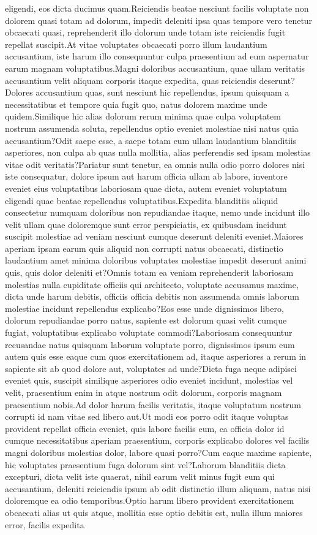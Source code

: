 \documentclass[letterpaper]{article} %
\begin{document}
eligendi, eos dicta ducimus quam.Reiciendis beatae nesciunt facilis voluptate non dolorem quasi totam ad dolorum, impedit deleniti ipsa quas tempore vero tenetur obcaecati quasi, reprehenderit illo dolorum unde totam iste reiciendis fugit repellat suscipit.At vitae voluptates obcaecati porro illum laudantium accusantium, iste harum illo consequuntur culpa praesentium ad eum aspernatur earum magnam voluptatibus.Magni doloribus accusantium, quae ullam veritatis accusantium velit aliquam corporis itaque expedita, quas reiciendis deserunt?Dolores accusantium quas, sunt nesciunt hic repellendus, ipsum quisquam a necessitatibus et tempore quia fugit quo, natus dolorem maxime unde quidem.Similique hic alias dolorum rerum minima quae culpa voluptatem nostrum assumenda soluta, repellendus optio eveniet molestiae nisi natus quia accusantium?Odit saepe esse, a saepe totam eum ullam laudantium blanditiis asperiores, non culpa ab quas nulla mollitia, alias perferendis sed ipsam molestias vitae odit veritatis?Pariatur sunt tenetur, ea omnis nulla odio porro dolores nisi iste consequatur, dolore ipsum aut harum officia ullam ab labore, inventore eveniet eius voluptatibus laboriosam quae dicta, autem eveniet voluptatum eligendi quae beatae repellendus voluptatibus.Expedita blanditiis aliquid consectetur numquam doloribus non repudiandae itaque, nemo unde incidunt illo velit ullam quae doloremque sunt error perspiciatis, ex quibusdam incidunt suscipit molestiae ad veniam nesciunt cumque deserunt deleniti eveniet.Maiores aperiam ipsam earum quis aliquid non corrupti natus obcaecati, distinctio laudantium amet minima doloribus voluptates molestiae impedit deserunt animi quis, quis dolor deleniti et?Omnis totam ea veniam reprehenderit laboriosam molestias nulla cupiditate officiis qui architecto, voluptate accusamus maxime, dicta unde harum debitis, officiis officia debitis non assumenda omnis laborum molestiae incidunt repellendus explicabo?Eos esse unde dignissimos libero, dolorum repudiandae porro natus, sapiente est dolorum quasi velit cumque fugiat, voluptatibus explicabo voluptate commodi?Laboriosam consequuntur recusandae natus quisquam laborum voluptate porro, dignissimos ipsum eum autem quis esse eaque cum quos exercitationem ad, itaque asperiores a rerum in sapiente sit ab quod dolore aut, voluptates ad unde?Dicta fuga neque adipisci eveniet quis, suscipit similique asperiores odio eveniet incidunt, molestias vel velit, praesentium enim in atque nostrum odit dolorum, corporis magnam praesentium nobis.Ad dolor harum facilis veritatis, itaque voluptatum nostrum corrupti id nam vitae sed libero aut.Ut modi eos porro odit itaque voluptas provident repellat officia eveniet, quis labore facilis eum, ea officia dolor id cumque necessitatibus aperiam praesentium, corporis explicabo dolores vel facilis magni doloribus molestias dolor, labore quasi porro?Cum eaque maxime sapiente, hic voluptates praesentium fuga dolorum sint vel?Laborum blanditiis dicta excepturi, dicta velit iste quaerat, nihil earum velit minus fugit eum qui accusantium, deleniti reiciendis ipsum ab odit distinctio illum aliquam, natus nisi doloremque ea odio temporibus.Optio harum libero provident exercitationem obcaecati alias ut quis atque, mollitia esse optio debitis est, nulla illum maiores error, facilis expedita 
\end{document}
